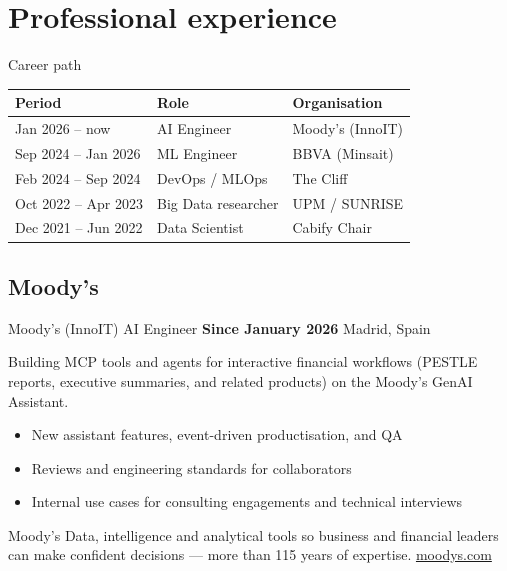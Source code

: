 \documentclass[10pt]{beamer}
\begin{document}
\section{Professional experience}

\begin{frame}{Career path}
  \begin{table}
    \small
    \begin{tabular}{@{}lll@{}}
      \toprule
      Period & Role & Organisation \\
      \midrule
      Jan 2026 -- now & AI Engineer & Moody's (InnoIT) \\
      Sep 2024 -- Jan 2026 & ML Engineer & BBVA (Minsait) \\
      Feb 2024 -- Sep 2024 & DevOps / MLOps & The Cliff \\
      Oct 2022 -- Apr 2023 & Big Data researcher & UPM / SUNRISE \\
      Dec 2021 -- Jun 2022 & Data Scientist & Cabify Chair \\
      \bottomrule
    \end{tabular}
  \end{table}
\end{frame}

\subsection{Moody's}

\begin{frame}{Moody's (InnoIT) \textperiodcentered{} AI Engineer}
  \textbf{Since January 2026} \hfill Madrid, Spain

  \vspace{0.3em}
  Building MCP tools and agents for interactive financial workflows
  (PESTLE reports, executive summaries, and related products) on the
  Moody's GenAI Assistant.

  \begin{itemize}
    \item New assistant features, event-driven productisation, and QA
    \item Reviews and engineering standards for collaborators
    \item Internal use cases for consulting engagements and technical
          interviews
  \end{itemize}

  \begin{exampleblock}{Moody's}
    Data, intelligence and analytical tools so business and financial leaders
    can make confident decisions --- more than 115 years of expertise.
    \hfill \href{https://www.moodys.com/}{moodys.com}
  \end{exampleblock}
\end{frame}
\end{document}
